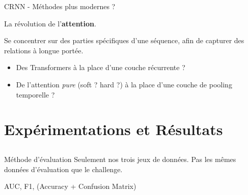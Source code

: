 \documentclass[compress,xcolor=table]{beamer}
\begin{document}
\begin{frame}{CRNN - Méthodes plus modernes ?}

    La révolution de l'\textbf{attention}.

    \begin{block}{ \cite{attentionIsAllYouNeed}}
        Se concentrer sur des parties spécifiques d'une séquence, afin de capturer des relations à longue portée.

        \begin{itemize}
            \item Des Transformers à la place d'une couche récurrente ?
            \item De l'attention \textit{pure} (soft ? hard ?) à la place d'une couche de pooling temporelle ?
        \end{itemize}
    \end{block}

\end{frame}

\section{Expérimentations et Résultats} \subsection{}

\begin{frame}{Méthode d'évaluation}
    Seulement nos trois jeux de données. Pas les mêmes données d'évaluation que le challenge.
    
    AUC, F1, (Accuracy + Confusion Matrix)
\end{frame}
\end{document}
